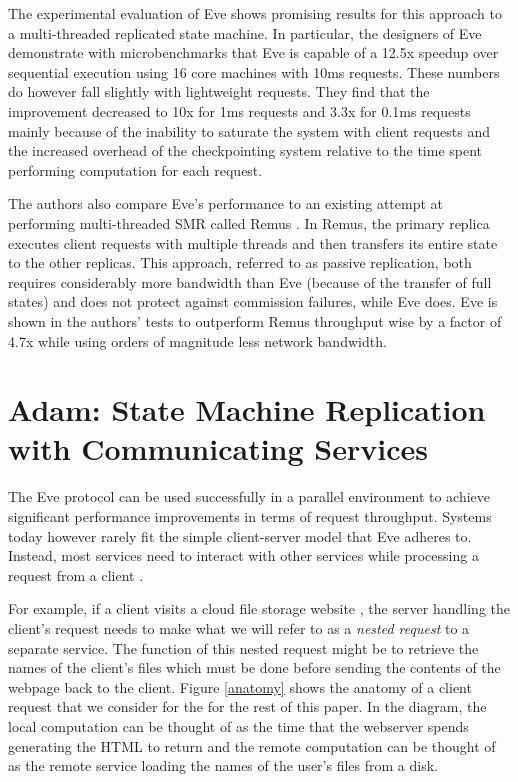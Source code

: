 \documentclass[11pt, oneside]{report}
\begin{document}
The experimental evaluation of Eve shows promising results for this approach to a multi-threaded replicated state machine. 
In particular, the designers of Eve demonstrate with microbenchmarks that Eve is capable of a 12.5x speedup over sequential execution using 16 core machines with 10ms requests. 
These numbers do however fall slightly with lightweight requests. 
They find that the improvement decreased to 10x for 1ms requests and 3.3x for 0.1ms requests mainly because of the inability to saturate the system with client requests and the increased overhead of the checkpointing system relative to the time spent performing computation for each request.

The authors also compare Eve's performance to an existing attempt at performing multi-threaded SMR called Remus \cite{remus}. 
In Remus, the primary replica executes client requests with multiple threads and then transfers its entire state to the other replicas. 
This approach, referred to as passive replication, both requires considerably more bandwidth than Eve (because of the transfer of full states) and does not protect against commission failures, while Eve does. 
Eve is shown in the authors' tests to outperform Remus throughput wise by a factor of 4.7x while using orders of magnitude less network bandwidth.

\chapter{Adam: State Machine Replication with Communicating Services}\label{Adam}

The Eve protocol can be used successfully in a parallel environment to achieve significant performance improvements in terms of request throughput. Systems today however rarely fit the simple client-server model that Eve adheres to.
Instead, most services need to interact with other services while processing a request from a client \cite{tao, spanner, dynamo}. 

For example, if a client visits a cloud file storage website \cite{dropbox}, the server handling the client's request needs to make what we will refer to as a \emph{nested request} to a separate service. The function of this nested request might be to retrieve the names of the client's files which must be done before sending the contents of the webpage back to the client. Figure \ref{anatomy} shows the anatomy of a client request that we consider for the for the rest of this paper. In the diagram, the local computation can be thought of as the time that the webserver spends generating the HTML to return and the remote computation can be thought of as the remote service loading the names of the user's files from a disk.
\end{document}
